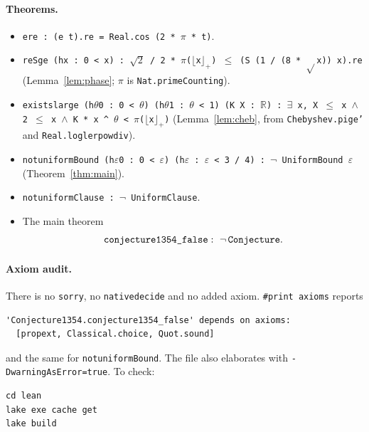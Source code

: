 \documentclass[11pt]{article}
\theoremstyle{definition}
\theoremstyle{remark}
\renewcommand{\_}{\oldus\allowbreak}
\begin{document}
\paragraph{Theorems.}
\begin{itemize}
\item \texttt{e\_re : (e t).re = Real.cos (2 * $\pi$ * t)}.
\item \texttt{re\_S\_ge (hx : 0 < x) : $\sqrt{2}$ / 2 * $\pi$($\lfloor$x$\rfloor_+$) $\le$ (S (1 / (8 * $\sqrt{}$x)) x).re}
  (Lemma~\ref{lem:phase}; $\pi$ is \texttt{Nat.primeCounting}).
\item \texttt{exists\_large (h$\theta$0 : 0 < $\theta$) (h$\theta$1 : $\theta$ < 1) (K X : $\mathbb{R}$) :
  $\exists$ x, X $\le$ x $\wedge$ 2 $\le$ x $\wedge$ K * x \^{} $\theta$ < $\pi$($\lfloor$x$\rfloor_+$)}
  (Lemma~\ref{lem:cheb}, from \texttt{Chebyshev.pi\_ge'} and \texttt{Real.log\_le\_rpow\_div}).
\item \texttt{not\_uniformBound (h$\varepsilon$0 : 0 < $\varepsilon$) (h$\varepsilon$ : $\varepsilon$ < 3 / 4) :
  $\neg$ UniformBound $\varepsilon$} (Theorem~\ref{thm:main}).
\item \texttt{not\_uniformClause : $\neg$ UniformClause}.
\item The main theorem
\[
  \texttt{conjecture1354\_false} :\ \neg\,\texttt{Conjecture}.
\]
\end{itemize}

\paragraph{Axiom audit.} There is no \texttt{sorry}, no \texttt{native\_decide} and no added axiom.
\texttt{\#print axioms} reports
\begin{verbatim}
'Conjecture1354.conjecture1354_false' depends on axioms:
  [propext, Classical.choice, Quot.sound]
\end{verbatim}
and the same for \texttt{not\_uniformBound}. The file also elaborates with
\texttt{-DwarningAsError=true}. To check:
\begin{verbatim}
cd lean
lake exe cache get
lake build
\end{verbatim}
\end{document}
